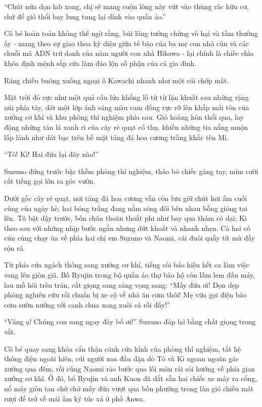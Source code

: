 \documentclass[../main.tex]{subfiles}
\begin{document}
``Chút nữa dọn lab xong, chị sẽ mang cuộn lông này vứt vào thùng rác hữu cơ, chứ để gió thổi bay lung tung lại dính vào quần áo.''

Cô bé hoàn toàn không thể ngờ rằng, búi lông tưởng chừng vô hại và tầm thường ấy - mang theo sự giao thoa kỳ diệu giữa tế bào của ba mẹ con nhà cún và các chuỗi mã ADN trứ danh của năm người con nhà Hikawa - lại chính là chiếc chìa khóa định mệnh sắp sửa làm đảo lộn số phận của cả gia đình.

\ct

Ráng chiều buông xuống ngoại ô Kawachi nhanh như một cái chớp mắt.

Mặt trời đỏ rực như một quả cầu lửa khổng lồ từ từ lặn khuất sau những rặng núi phía tây, dát một lớp ánh sáng màu cam đồng rực rỡ lên khắp mái tôn của xưởng cơ khí và khu phòng thí nghiệm phía sau. Gió hoàng hôn thổi qua, lay động những tán lá xanh rì của cây rẻ quạt cổ thụ, khiến những tia nắng muộn lấp lánh như dát bạc trên bề mặt tảng đá hoa cương trắng khắc tên Mi.

``Tô! Ki! Hai đứa lại đây nào!''

Suzuno đứng trước bậc thềm phòng thí nghiệm, tháo bỏ chiếc găng tay, mỉm cười cất tiếng gọi lớn ra góc vườn.

Dưới gốc cây rẻ quạt, nơi tảng đá hoa cương vẫn còn lưu giữ chút hơi ấm cuối cùng của ngày hè, hai bóng trắng đang nằm sóng đôi bên nhau bỗng giỏng tai lên. Tô bật dậy trước, bốn chân thoăn thoắt phi như bay qua thảm cỏ dại; Ki theo sau với những nhịp bước ngắn nhưng dứt khoát và nhanh nhẹn. Cả hai cô cún cùng chạy ùa về phía hai chị em Suzuno và Naomi, cái đuôi quẫy tít mù đầy rộn rã.

Từ phía cửa ngách thông sang xưởng cơ khí, tiếng còi báo hiệu hết ca làm việc vang lên giòn giã. Bố Ryujin trong bộ quần áo thợ bảo hộ còn lấm lem dầu máy, lau mồ hôi trên trán, cất giọng sang sảng vọng sang: ``Mấy đứa ơi! Dọn dẹp phòng nghiên cứu rồi chuẩn bị xe cộ về nhà ăn cơm thôi! Mẹ vừa gọi điện báo cơm sườn nướng với canh chua xong xuôi cả rồi đấy!''

``Vâng ạ! Chúng con sang ngay đây bố ơi!'' Suzuno đáp lại bằng chất giọng trong vắt.

Cô bé quay sang khóa cẩn thận cánh cửa kính của phòng thí nghiệm, tắt hệ thống điện ngoài hiên, cúi người xoa đầu dặn dò Tô và Ki ngoan ngoãn gác xưởng qua đêm, rồi cùng Naomi rảo bước qua lối mòn rải sỏi hướng về phía gian xưởng cơ khí. Ở đó, bố Ryujin và anh Kuon đã dắt sẵn hai chiếc xe máy ra cổng, nổ máy giòn tan chờ chở mấy đứa vượt qua bốn phường trong làn gió chiều mát rượi để trở về mái ấm ký túc xá ở phố Anwa.
\end{document}
